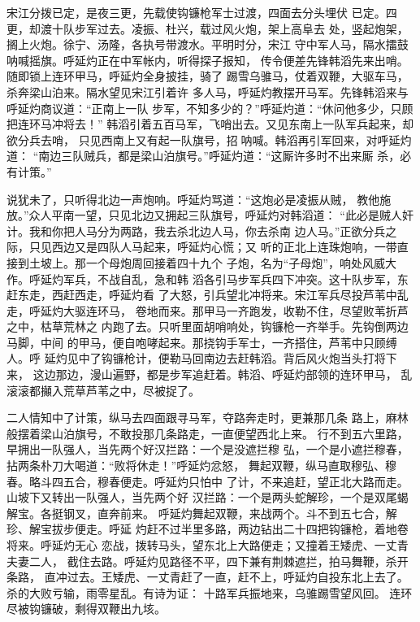 宋江分拨已定，是夜三更，先载使钩镰枪军士过渡，四面去分头埋伏
已定。四更，却渡十队步军过去。凌振、杜兴，载过风火炮，架上高阜去
处，竖起炮架，搁上火炮。徐宁、汤隆，各执号带渡水。平明时分，宋江
守中军人马，隔水擂鼓呐喊摇旗。呼延灼正在中军帐内，听得探子报知，
传令便差先锋韩滔先来出哨。随即锁上连环甲马，呼延灼全身披挂，骑了
踢雪乌骓马，仗着双鞭，大驱车马，杀奔梁山泊来。隔水望见宋江引着许
多人马，呼延灼教摆开马军。先锋韩滔来与呼延灼商议道：“正南上一队
步军，不知多少的？”呼延灼道：“休问他多少，只顾把连环马冲将去！”
韩滔引着五百马军，飞哨出去。又见东南上一队军兵起来，却欲分兵去哨，
只见西南上又有起一队旗号，招呐喊。韩滔再引军回来，对呼延灼道：
“南边三队贼兵，都是梁山泊旗号。”呼延灼道：“这厮许多时不出来厮
杀，必有计策。”

说犹未了，只听得北边一声炮响。呼延灼骂道：“这炮必是凌振从贼，
教他施放。”众人平南一望，只见北边又拥起三队旗号，呼延灼对韩滔道：
“此必是贼人奸计。我和你把人马分为两路，我去杀北边人马，你去杀南
边人马。”正欲分兵之际，只见西边又是四队人马起来，呼延灼心慌；又
听的正北上连珠炮响，一带直接到土坡上。那一个母炮周回接着四十九个
子炮，名为“子母炮”，响处风威大作。呼延灼军兵，不战自乱，急和韩
滔各引马步军兵四下冲突。这十队步军，东赶东走，西赶西走，呼延灼看
了大怒，引兵望北冲将来。宋江军兵尽投芦苇中乱走，呼延灼大驱连环马，
卷地而来。那甲马一齐跑发，收勒不住，尽望败苇折芦之中，枯草荒林之
内跑了去。只听里面胡哨响处，钩镰枪一齐举手。先钩倒两边马脚，中间
的甲马，便自咆哮起来。那挠钩手军士，一齐搭住，芦苇中只顾缚人。呼
延灼见中了钩镰枪计，便勒马回南边去赶韩滔。背后风火炮当头打将下来，
这边那边，漫山遍野，都是步军追赶着。韩滔、呼延灼部领的连环甲马，
乱滚滚都攧入荒草芦苇之中，尽被捉了。

二人情知中了计策，纵马去四面跟寻马军，夺路奔走时，更兼那几条
路上，麻林般摆着梁山泊旗号，不敢投那几条路走，一直便望西北上来。
行不到五六里路，早拥出一队强人，当先两个好汉拦路：一个是没遮拦穆
弘，一个是小遮拦穆春，拈两条朴刀大喝道：“败将休走！”呼延灼忿怒，
舞起双鞭，纵马直取穆弘、穆春。略斗四五合，穆春便走。呼延灼只怕中
了计，不来追赶，望正北大路而走。山坡下又转出一队强人，当先两个好
汉拦路：一个是两头蛇解珍，一个是双尾蝎解宝。各挺钢叉，直奔前来。
呼延灼舞起双鞭，来战两个。斗不到五七合，解珍、解宝拔步便走。呼延
灼赶不过半里多路，两边钻出二十四把钩镰枪，着地卷将来。呼延灼无心
恋战，拨转马头，望东北上大路便走；又撞着王矮虎、一丈青夫妻二人，
截住去路。呼延灼见路径不平，四下兼有荆棘遮拦，拍马舞鞭，杀开条路，
直冲过去。王矮虎、一丈青赶了一直，赶不上，呼延灼自投东北上去了。
杀的大败亏输，雨零星乱。有诗为证：
十路军兵振地来，乌骓踢雪望风回。
连环尽被钩镰破，剩得双鞭出九垓。

